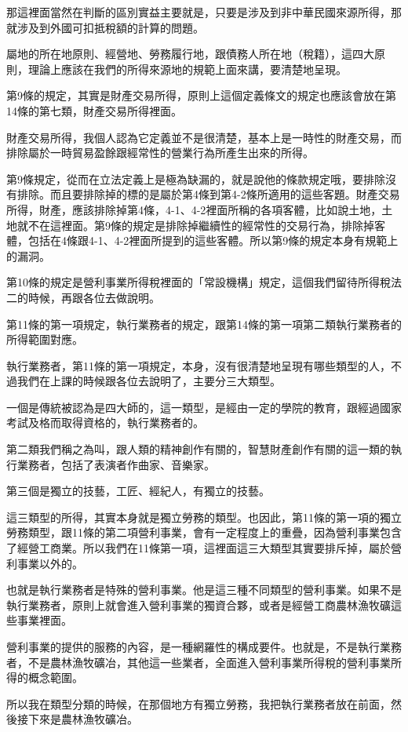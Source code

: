 \documentclass[]{ctexbook}
\begin{document}
那這裡面當然在判斷的區別實益主要就是，只要是涉及到非中華民國來源所得，那就涉及到外國可扣抵稅額的計算的問題。

屬地的所在地原則、經營地、勞務履行地，跟債務人所在地（稅籍），這四大原則，理論上應該在我們的所得來源地的規範上面來講，要清楚地呈現。

第9條的規定，其實是財產交易所得，原則上這個定義條文的規定也應該會放在第14條的第七類，財產交易所得裡面。

財產交易所得，我個人認為它定義並不是很清楚，基本上是一時性的財產交易，而排除屬於一時貿易盈餘跟經常性的營業行為所產生出來的所得。

第9條規定，從而在立法定義上是極為缺漏的，就是說他的條款規定哦，要排除沒有排除。而且要排除掉的標的是屬於第4條到第4-2條所適用的這些客題。財產交易所得，財產，應該排除掉第4條，4-1、4-2裡面所稱的各項客體，比如說土地，土地就不在這裡面。第9條的規定是排除掉繼續性的經常性的交易行為，排除掉客體，包括在4條跟4-1、4-2裡面所提到的這些客體。所以第9條的規定本身有規範上的漏洞。

第10條的規定是營利事業所得稅裡面的「常設機構」規定，這個我們留待所得稅法二的時候，再跟各位去做說明。

第11條的第一項規定，執行業務者的規定，跟第14條的第一項第二類執行業務者的所得範圍對應。

執行業務者，第11條的第一項規定，本身，沒有很清楚地呈現有哪些類型的人，不過我們在上課的時候跟各位去說明了，主要分三大類型。

一個是傳統被認為是四大師的，這一類型，是經由一定的學院的教育，跟經過國家考試及格而取得資格的，執行業務者的。

第二類我們稱之為叫，跟人類的精神創作有關的，智慧財產創作有關的這一類的執行業務者，包括了表演者作曲家、音樂家。

第三個是獨立的技藝，工匠、經紀人，有獨立的技藝。

這三類型的所得，其實本身就是獨立勞務的類型。也因此，第11條的第一項的獨立勞務類型，跟11條的第二項營利事業，會有一定程度上的重疊，因為營利事業包含了經營工商業。所以我們在11條第一項，這裡面這三大類型其實要排斥掉，屬於營利事業以外的。

也就是執行業務者是特殊的營利事業。他是這三種不同類型的營利事業。如果不是執行業務者，原則上就會進入營利事業的獨資合夥，或者是經營工商農林漁牧礦這些事業裡面。

營利事業的提供的服務的內容，是一種網羅性的構成要件。也就是，不是執行業務者，不是農林漁牧礦冶，其他這一些業者，全面進入營利事業所得稅的營利事業所得的概念範圍。

所以我在類型分類的時候，在那個地方有獨立勞務，我把執行業務者放在前面，然後接下來是農林漁牧礦冶。
\end{document}
